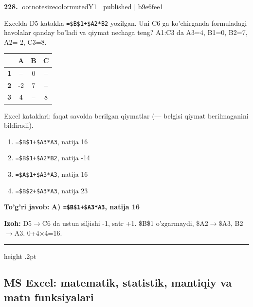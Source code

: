 \documentclass[10pt,a4paper]{article}
\begin{document}
\textbf{\color{ink}228.} {ootnotesizecolor{muted}Y1 | published | b9e6fee1}
\par
Excelda D5 katakka \texttt{=\$B\$1+\$A2*B2} yozilgan. Uni C6 ga ko'chirganda formuladagi havolalar qanday bo'ladi va qiymat nechaga teng? A1:C3 da A3=4, B1=0, B2=7, A2=-2, C3=8.
\begin{center}\begingroup\small\setlength{\tabcolsep}{9pt}\renewcommand{\arraystretch}{1.28}
\begin{tabular}{|>{\columncolor{gray!12}}c|c|c|c|}
\hline
\rowcolor{gray!12} \textbf{} & \textbf{A} & \textbf{B} & \textbf{C}\\ \hline
\textbf{1} & \textcolor{gray}{--} & 0 & \textcolor{gray}{--}\\ \hline
\textbf{2} & -2 & 7 & \textcolor{gray}{--}\\ \hline
\textbf{3} & 4 & \textcolor{gray}{--} & 8\\ \hline
\end{tabular}\endgroup\par{\footnotesize\color{muted}Excel kataklari: faqat savolda berilgan qiymatlar (--- belgisi qiymat berilmaganini bildiradi).}\end{center}
\begin{enumerate}[label=\Alph*),leftmargin=9mm]
\item \texttt{=\$B\$1+\$A3*A3}, natija 16
\item \texttt{=\$B\$1+\$A2*B2}, natija -14
\item \texttt{=\$A\$1+\$A3*A3}, natija 16
\item \texttt{=\$B\$2+\$A3*A3}, natija 23
\end{enumerate}
\begin{tcolorbox}[enhanced,breakable,colback=teal!4,colframe=teal!55!black,boxrule=0.45pt,arc=1.2mm,left=2.8mm,right=2.8mm,top=2mm,bottom=2mm]
\textbf{\color{teal}To'g'ri javob:} \textbf{A) \texttt{=\$B\$1+\$A3*A3}, natija 16}
\par\smallskip
\textbf{Izoh:} D5\ensuremath{\rightarrow}C6 da ustun siljishi -1, satr +1. \$B\$1 o'zgarmaydi, \$A2\ensuremath{\rightarrow}\$A3, B2\ensuremath{\rightarrow}A3. 0+4\ensuremath{\times}4=16.
\end{tcolorbox}
\vspace{2mm}\hrule height .2pt\vspace{2mm}
\subsection{MS Excel: matematik, statistik, mantiqiy va matn funksiyalari}
\end{document}
